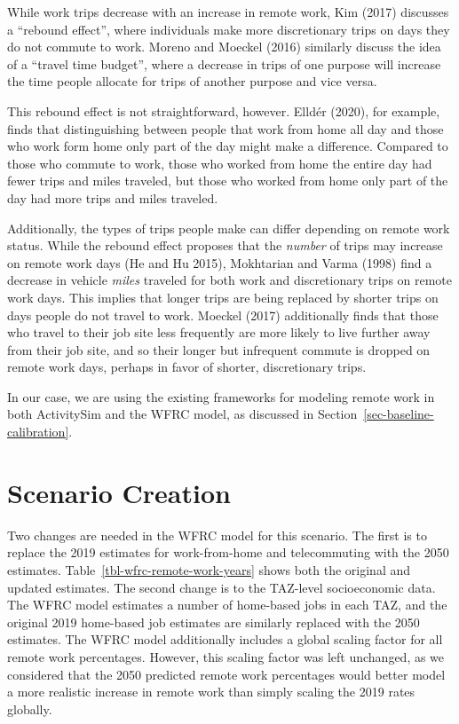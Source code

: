 \documentclass[fancy, twoside, mastersfancy, ms]{byuthesis}
\begin{document}
While work trips decrease with an increase in remote work, Kim (2017)
discusses a ``rebound effect'', where individuals make more
discretionary trips on days they do not commute to work. Moreno and
Moeckel (2016) similarly discuss the idea of a ``travel time budget'',
where a decrease in trips of one purpose will increase the time people
allocate for trips of another purpose and vice versa.

This rebound effect is not straightforward, however. Elldér (2020), for
example, finds that distinguishing between people that work from home
all day and those who work form home only part of the day might make a
difference. Compared to those who commute to work, those who worked from
home the entire day had fewer trips and miles traveled, but those who
worked from home only part of the day had more trips and miles traveled.

Additionally, the types of trips people make can differ depending on
remote work status. While the rebound effect proposes that the
\emph{number} of trips may increase on remote work days (He and Hu
2015), Mokhtarian and Varma (1998) find a decrease in vehicle
\emph{miles} traveled for both work and discretionary trips on remote
work days. This implies that longer trips are being replaced by shorter
trips on days people do not travel to work. Moeckel (2017) additionally
finds that those who travel to their job site less frequently are more
likely to live further away from their job site, and so their longer but
infrequent commute is dropped on remote work days, perhaps in favor of
shorter, discretionary trips.

In our case, we are using the existing frameworks for modeling remote
work in both ActivitySim and the WFRC model, as discussed in
Section~\ref{sec-baseline-calibration}.

\section{Scenario Creation}\label{scenario-creation-2}

Two changes are needed in the WFRC model for this scenario. The first is
to replace the 2019 estimates for work-from-home and telecommuting with
the 2050 estimates. Table~\ref{tbl-wfrc-remote-work-years} shows both
the original and updated estimates. The second change is to the
TAZ-level socioeconomic data. The WFRC model estimates a number of
home-based jobs in each TAZ, and the original 2019 home-based job
estimates are similarly replaced with the 2050 estimates. The WFRC model
additionally includes a global scaling factor for all remote work
percentages. However, this scaling factor was left unchanged, as we
considered that the 2050 predicted remote work percentages would better
model a more realistic increase in remote work than simply scaling the
2019 rates globally.
\end{document}
